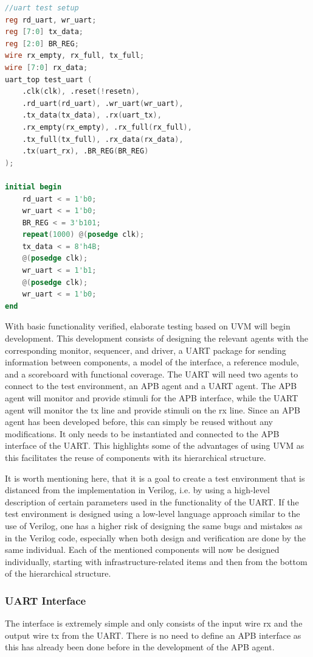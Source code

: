\documentclass[./dissertation.tex]{subfiles}
\begin{document}
\begin{lstlisting}[caption={Verilog code for basic functionality testing of the UART controller},label={uart_verilog_test_code},language=verilog]
//uart test setup
reg rd_uart, wr_uart;
reg [7:0] tx_data;
reg [2:0] BR_REG;
wire rx_empty, rx_full, tx_full;
wire [7:0] rx_data;
uart_top test_uart (
	.clk(clk), .reset(!resetn),
	.rd_uart(rd_uart), .wr_uart(wr_uart),
	.tx_data(tx_data), .rx(uart_tx), 
	.rx_empty(rx_empty), .rx_full(rx_full), 
	.tx_full(tx_full), .rx_data(rx_data),
	.tx(uart_rx), .BR_REG(BR_REG)
);
	
initial begin
	rd_uart < = 1'b0;
	wr_uart < = 1'b0;
	BR_REG < = 3'b101;
	repeat(1000) @(posedge clk);
	tx_data < = 8'h4B;
	@(posedge clk);
	wr_uart < = 1'b1;
	@(posedge clk);
	wr_uart < = 1'b0;
end
\end{lstlisting}

With basic functionality verified, elaborate testing based on UVM will begin development. This development consists of designing the relevant agents with the corresponding monitor, sequencer, and driver, a UART package for sending information between components, a model of the interface, a reference module, and a scoreboard with functional coverage. The UART will need two agents to connect to the test environment, an APB agent and a UART agent. The APB agent will monitor and provide stimuli for the APB interface, while the UART agent will monitor the tx line and provide stimuli on the rx line. Since an APB agent has been developed before, this can simply be reused without any modifications. It only needs to be instantiated and connected to the APB interface of the UART. This highlights some of the advantages of using UVM as this facilitates the reuse of components with its hierarchical structure. 

It is worth mentioning here, that it is a goal to create a test environment that is distanced from the implementation in Verilog, i.e. by using a high-level description of certain parameters used in the functionality of the UART. If the test environment is designed using a low-level language approach similar to the use of Verilog, one has a higher risk of designing the same bugs and mistakes as in the Verilog code, especially when both design and verification are done by the same individual. Each of the mentioned components will now be designed individually, starting with infrastructure-related items and then from the bottom of the hierarchical structure.

\subsubsection{UART Interface}
The interface is extremely simple and only consists of the input wire rx and the output wire tx from the UART. There is no need to define an APB interface as this has already been done before in the development of the APB agent.
\end{document}
